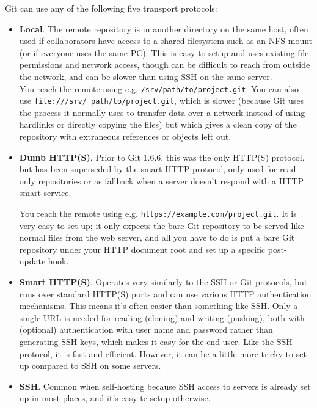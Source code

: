 \documentclass[8pt, table, xcdraw]{article}%
\begin{document}
Git can use any of the following five transport protocols:

\begin{itemize}
    \item \textbf{Local}. The remote repository is in another directory on the same host, often used if collaborators have access to a shared filesystem such as an NFS mount (or if everyone uses the same PC). This is easy to setup and uses existing file permissions and network access, though can be difficult to reach from outside the network, and can be slower than using SSH on the same server.\\
    
    You reach the remote using e.g. \lstinline{/srv/path/to/project.git}. You can also use \lstinline{file:///srv/ path/to/project.git}, which is slower (because Git uses the process it normally uses to transfer data over a network instead of using hardlinks or directly copying the files) but which gives a clean copy of the repository with extraneous references or objects left out.
    \item \textbf{Dumb HTTP(S)}. Prior to Git 1.6.6, this was the only HTTP(S) protocol, but has been superseded by the smart HTTP protocol, only used for read-only repositories or as fallback when a server doesn't respond with a HTTP smart service.
    
    You reach the remote using e.g. \lstinline{https://example.com/project.git}. It is very easy to set up; it only expects the bare Git repository to be served like normal files from the web server, and all you have to do is put a bare Git repository under your HTTP document root and set up a specific post-update hook.
    
    
    \item \textbf{Smart HTTP(S)}. Operates very similarly to the SSH or Git protocols, but runs over standard HTTP(S) ports and can use various HTTP authentication mechanisms. This means it's often easier than something like SSH. Only a single URL is needed for reading (cloning) and writing (pushing), both with (optional) authentication with user name and password rather than generating SSH keys, which makes it easy for the end user. Like the SSH protocol, it is fast and efficient. However, it can be a little more tricky to set up compared to SSH on some servers.
    \item \textbf{SSH}. Common when self-hosting because SSH access to servers is already set up in most places, and it's easy te setup otherwise.
    

\end{itemize}
\end{document}
